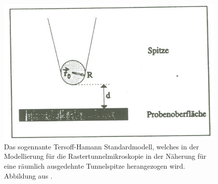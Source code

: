 \begin{figure}
    \includegraphics[width=14cm]{pics/tersoff_hamann}
    \caption{Das sogennante Tersoff-Hamann Standardmodell, welches in
        der Modellierung für die Rastertunnelmikroskopie in der Näherung
        für eine räumlich ausgedehnte Tunnelspitze herangezogen wird.
        Abbildung aus \cite{staatsexamen}.}
\label{fig:tersoff_hamann}
\end{figure}

